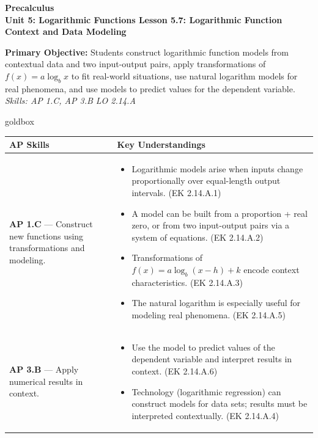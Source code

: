 \documentclass[10pt]{article}
\newcommand{\CourseName}{Precalculus}
\newcommand{\UnitNumberName}{Unit 5: Logarithmic Functions \quad}
\newcommand{\LessonNumberName}{Lesson 5.7: Logarithmic Function Context and Data Modeling}
\begin{document}
\begin{center}
    {\Large\bfseries \CourseName \\
    {\small\bfseries \UnitNumberName \LessonNumberName}}
\end{center}

\begin{tcolorbox}[colback=sky, colframe=navy, boxrule=0.9pt, arc=2mm,
    left=2mm, right=2mm, top=1.5mm, bottom=1.5mm]
    \textbf{Primary Objective:} Students construct logarithmic function models from contextual
    data and two input-output pairs, apply transformations of $f(x) = a\log_b x$ to fit
    real-world situations, use natural logarithm models for real phenomena, and use models to
    predict values for the dependent variable.
    \hfill\textit{\small Skills: AP 1.C, AP 3.B \quad LO 2.14.A}
\end{tcolorbox}

\renewcommand{\arraystretch}{1.6}
\begin{skillbox}{goldbox}
\begin{tabularx}{\linewidth}{@{}X X@{}}
\textbf{AP Skills} &
\textbf{Key Understandings} \\
\midrule
\textbf{AP 1.C} --- Construct new functions using transformations and modeling. &
\begin{itemize}[leftmargin=1.2em,itemsep=2pt,topsep=0pt]
  \item Logarithmic models arise when inputs change proportionally over equal-length output
        intervals. (EK 2.14.A.1)
  \item A model can be built from a proportion + real zero, or from two input-output pairs
        via a system of equations. (EK 2.14.A.2)
  \item Transformations of $f(x)=a\log_b(x-h)+k$ encode context characteristics.
        (EK 2.14.A.3)
  \item The natural logarithm is especially useful for modeling real phenomena.
        (EK 2.14.A.5)
\end{itemize} \\
\textbf{AP 3.B} --- Apply numerical results in context. &
\begin{itemize}[leftmargin=1.2em,itemsep=2pt,topsep=0pt]
  \item Use the model to predict values of the dependent variable and interpret results
        in context. (EK 2.14.A.6)
  \item Technology (logarithmic regression) can construct models for data sets; results
        must be interpreted contextually. (EK 2.14.A.4)
\end{itemize} \\
\end{tabularx}
\end{skillbox}
\end{document}
